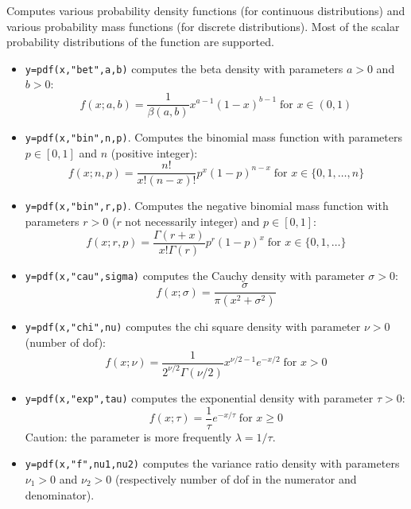 \begin{mandescription}
  Computes various probability density functions (for continuous
  distributions) 
  and various probability mass functions (for discrete distributions). Most of the
  scalar probability distributions of the 
  function are supported. 
\begin{itemize}

\item {} \verb!y=pdf(x,"bet",a,b)! computes the beta
  density with parameters $a > 0$ and $b > 0$:
$$
     f(x; a, b) =
        \frac{1}{\beta(a,b)} x^{a-1}(1-x)^{b-1} \;
        \mbox{for } x \in (0,1)
$$

\item {} \verb!y=pdf(x,"bin",n,p)!. Computes
  the binomial mass function with parameters $p \in [0,1]$ and $n$
  (positive integer):
$$
     f(x; n, p) = \frac{ n! }{ x! (n-x)!} p^x (1-p)^{n-x} \;\mbox{for } x \in \{0,1,\dots,n\}
$$

\item {} \verb!y=pdf(x,"bin",r,p)!. Computes
  the negative binomial mass function with parameters $r > 0$ ($r$ not
  necessarily integer) and $p \in [0,1]$:
$$
     f(x; r, p) = \frac{ \Gamma(r+x) }{ x! \Gamma(r)} p^r (1-p)^x \;\mbox{for } x \in \{0,1,\dots\}
$$


\item {} \verb!y=pdf(x,"cau",sigma)! computes the Cauchy
  density with parameter $\sigma > 0$:
$$
     f(x; \sigma) = \frac{ \sigma }{ \pi ( x^2 + \sigma^2 ) }
$$


\item {} \verb!y=pdf(x,"chi",nu)! computes the chi square
  density with parameter $\nu > 0$ (number of dof):
$$
     f(x; \nu) = \frac{1}{2^{\nu/2} \Gamma(\nu/2)} x^{\nu/2-1} e^{-x/2}\; \mbox{for } x > 0 
$$


\item {} \verb!y=pdf(x,"exp",tau)! computes the exponential
  density with parameter $\tau > 0$:
$$
     f(x; \tau) = \frac{1}{\tau} e^{-x/\tau} \; \mbox{for } x
     \ge 0
$$
Caution: the parameter is more frequently $\lambda = 1/\tau$.


\item {} \verb!y=pdf(x,"f",nu1,nu2)! computes
  the variance ratio density with parameters $\nu_1 > 0$ and $\nu_2 >
  0$ (respectively number of dof in the numerator and denominator).



\end{itemize}
\end{mandescription}
